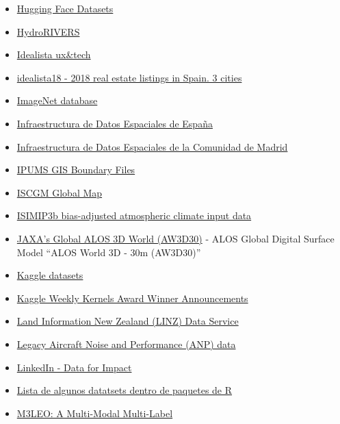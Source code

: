 \documentclass[
]{article}
\begin{document}
\begin{itemize}
\item
  \href{https://huggingface.co/datasets}{Hugging Face Datasets}
\item
  \href{https://www.hydrosheds.org/products/hydrorivers}{HydroRIVERS}
\item
  \href{https://www.idealista.com/labs/blog/}{Idealista ux\&tech}
\item
  \href{https://github.com/paezha/idealista18}{idealista18 - 2018 real
  estate listings in Spain. 3 cities}
\item
  \href{http://www.image-net.org/}{ImageNet database}
\item
  \href{https://idee.es/web/idee/inicio}{Infraestructura de Datos
  Espaciales de España}
\item
  \href{http://www.madrid.org/cartografia/idem/html/web/index.htm}{Infraestructura
  de Datos Espaciales de la Comunidad de Madrid}
\item
  \href{https://international.ipums.org/international/gis.shtml}{IPUMS
  GIS Boundary Files}
\item
  \href{https://globalmaps.github.io/}{ISCGM Global Map}
\item
  \href{https://data.isimip.org/datasets/24cb1007-3c96-4b59-a0dc-42d94a8cff8c/}{ISIMIP3b
  bias-adjusted atmospheric climate input data}
\item
  \href{https://www.eorc.jaxa.jp/ALOS/en/dataset/aw3d30/aw3d30_e.htm}{JAXA's
  Global ALOS 3D World (AW3D30)} - ALOS Global Digital Surface Model
  ``ALOS World 3D - 30m (AW3D30)''
\item
  \href{https://www.kaggle.com/datasets}{Kaggle datasets}
\item
  \href{https://www.kaggle.com/general/37924\#post354114}{Kaggle Weekly
  Kernels Award Winner Announcements}
\item
  \href{https://data.linz.govt.nz/}{Land Information New Zealand (LINZ)
  Data Service}
\item
  \href{https://www.easa.europa.eu/en/domains/environment/policy-support-and-research/aircraft-noise-and-performance-anp-data/anp-legacy-data}{Legacy
  Aircraft Noise and Performance (ANP) data}
\item
  \href{https://economicgraph.linkedin.com/data-for-impact}{LinkedIn -
  Data for Impact}
\item
  \href{https://vincentarelbundock.github.io/Rdatasets/datasets.html}{Lista
  de algunos datatsets dentro de paquetes de R}
\item
  \href{https://huggingface.co/M3LEO}{M3LEO: A Multi-Modal Multi-Label
}
\end{itemize}
\end{document}
